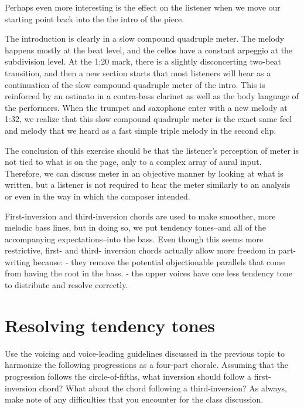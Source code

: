 \documentclass{book}
\begin{document}
Perhaps even more interesting is the effect on the listener when we move our
starting point back into the the intro of the piece.

The introduction is clearly in a slow compound quadruple meter. The melody
happens mostly at the beat level, and the cellos have a constant arpeggio at
the subdivision level. At the 1:20 mark, there is a slightly disconcerting
two-beat transition, and then a new section starts that most listeners will
hear as a continuation of the slow compound quadruple meter of the intro. This
is reinforced by an ostinato in a contra-bass clarinet as well as the body
language of the performers. When the trumpet and saxophone enter with a new
melody at 1:32, we realize that this slow compound quadruple meter is the
exact same feel and melody that we heard as a fast simple triple melody in the
second clip.

The conclusion of this exercise should be that the listener's perception of
meter is not tied to what is on the page, only to a complex array of aural
input. Therefore, we can discuss meter in an objective manner by looking at
what is written, but a listener is not required to hear the meter similarly to
an analysis or even in the way in which the composer intended.

First-inversion and third-inversion chords are used to make smoother, more
melodic bass lines, but in doing so, we put tendency tones--and all of the
accompanying expectations--into the bass. Even though this seems more
restrictive, first- and third- inversion chords actually allow more freedom in
part-writing because: - they remove the potential objectionable parallels that
come from having the root in the bass. - the upper voices have one less
tendency tone to distribute and resolve correctly.

\hypertarget{resolving-tendency-tones}{%
\section{Resolving tendency tones}\label{resolving-tendency-tones}}

Use the voicing and voice-leading guidelines discussed in the previous topic
to harmonize the following progressions as a four-part chorale. Assuming that
the progression follows the circle-of-fifths, what inversion should follow a
first-inversion chord? What about the chord following a third-inversion? As
always, make note of any difficulties that you encounter for the class
discussion.
\end{document}
